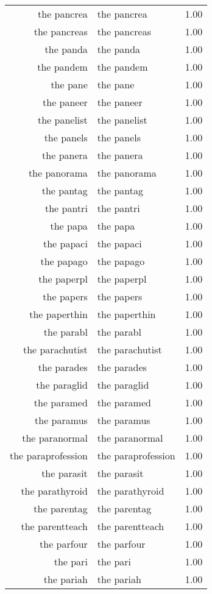 \begin{table}[ht]
\begin{tabular}{rlr}
  the pancrea & the pancrea & 1.00 \\ 
  the pancreas & the pancreas & 1.00 \\ 
  the panda & the panda & 1.00 \\ 
  the pandem & the pandem & 1.00 \\ 
  the pane & the pane & 1.00 \\ 
  the paneer & the paneer & 1.00 \\ 
  the panelist & the panelist & 1.00 \\ 
  the panels & the panels & 1.00 \\ 
  the panera & the panera & 1.00 \\ 
  the panorama & the panorama & 1.00 \\ 
  the pantag & the pantag & 1.00 \\ 
  the pantri & the pantri & 1.00 \\ 
  the papa & the papa & 1.00 \\ 
  the papaci & the papaci & 1.00 \\ 
  the papago & the papago & 1.00 \\ 
  the paperpl & the paperpl & 1.00 \\ 
  the papers & the papers & 1.00 \\ 
  the paperthin & the paperthin & 1.00 \\ 
  the parabl & the parabl & 1.00 \\ 
  the parachutist & the parachutist & 1.00 \\ 
  the parades & the parades & 1.00 \\ 
  the paraglid & the paraglid & 1.00 \\ 
  the paramed & the paramed & 1.00 \\ 
  the paramus & the paramus & 1.00 \\ 
  the paranormal & the paranormal & 1.00 \\ 
  the paraprofession & the paraprofession & 1.00 \\ 
  the parasit & the parasit & 1.00 \\ 
  the parathyroid & the parathyroid & 1.00 \\ 
  the parentag & the parentag & 1.00 \\ 
  the parentteach & the parentteach & 1.00 \\ 
  the parfour & the parfour & 1.00 \\ 
  the pari & the pari & 1.00 \\ 
  the pariah & the pariah & 1.00 \\ 

\end{tabular}
\end{table}
